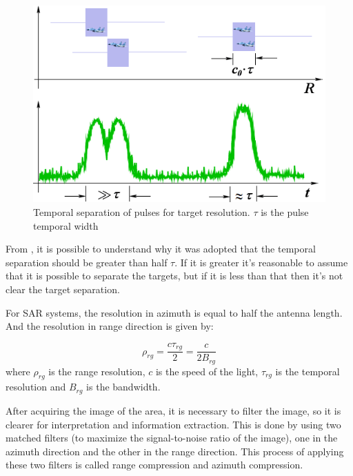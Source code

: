 \begin{figure}[H]
    \centering
    \includegraphics[width=0.8\linewidth]{Cap1/ra1_print.png}
    \caption{Temporal separation of pulses for target resolution. $\tau$ is the pulse temporal width}
    \label{fig:pulse_separation}
\end{figure}{}

From , it is possible to understand why it was adopted that the temporal separation should be greater than half $\tau$. If it is greater it's reasonable to assume that it is possible to separate the targets, but if it is less than that then it's not clear the target separation.

For SAR systems, the resolution in azimuth is equal to half the antenna length. And the resolution in range direction is given by: 

\begin{equation}
    \rho_{rg} = \frac{c\tau_{rg}}{2} = \frac{c}{2B_{rg}}
\end{equation}
where $\rho_{rg}$ is the range resolution, $c$ is the speed of the light, $\tau_{rg}$ is the temporal resolution and $B_{rg}$ is the bandwidth.

After acquiring the image of the area, it is necessary to filter the image, so it is clearer for interpretation and information extraction. This is done by using two matched filters (to maximize the signal-to-noise ratio of the image), one in the azimuth direction and the other in the range direction. 
This process of applying these two filters is called range compression and azimuth compression.

